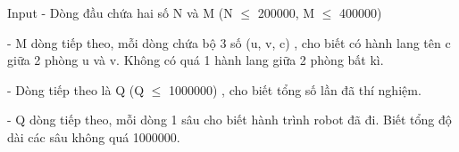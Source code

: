 Input
- Dòng đầu chứa hai số N và M (N  $\le$  200000, M  $\le$  400000)

- M dòng tiếp theo, mỗi dòng chứa bộ 3 số (u, v, c) , cho biết có hành lang tên c giữa 2 phòng u và v. Không có quá 1 hành lang giữa 2 phòng bất kì.

- Dòng tiếp theo là Q (Q  $\le$  1000000) , cho biết tổng số lần đã thí nghiệm.

- Q dòng tiếp theo, mỗi dòng 1 sâu cho biết hành trình robot đã đi. Biết tổng độ dài các sâu không quá 1000000.